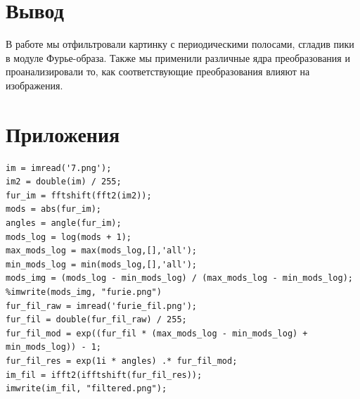 \documentclass[a4paper, 12pt]{article}
\begin{document}
\section{Вывод}
В работе мы отфильтровали картинку с периодическими полосами, сгладив пики в модуле Фурье-образа.
Также мы применили различные ядра преобразования и проанализировали то, как соответствующие преобразования влияют на изображения.
\newpage
\section{Приложения}
\begin{lstlisting}[caption={Код для обработки изображения в 1 пункте}]
im = imread('7.png');
im2 = double(im) / 255;
fur_im = fftshift(fft2(im2));
mods = abs(fur_im);
angles = angle(fur_im);
mods_log = log(mods + 1);
max_mods_log = max(mods_log,[],'all');
min_mods_log = min(mods_log,[],'all');
mods_img = (mods_log - min_mods_log) / (max_mods_log - min_mods_log);
%imwrite(mods_img, "furie.png")
fur_fil_raw = imread('furie_fil.png');
fur_fil = double(fur_fil_raw) / 255;
fur_fil_mod = exp((fur_fil * (max_mods_log - min_mods_log) + min_mods_log)) - 1; 
fur_fil_res = exp(1i * angles) .* fur_fil_mod;
im_fil = ifft2(ifftshift(fur_fil_res));
imwrite(im_fil, "filtered.png");
\end{lstlisting}
\end{document}

